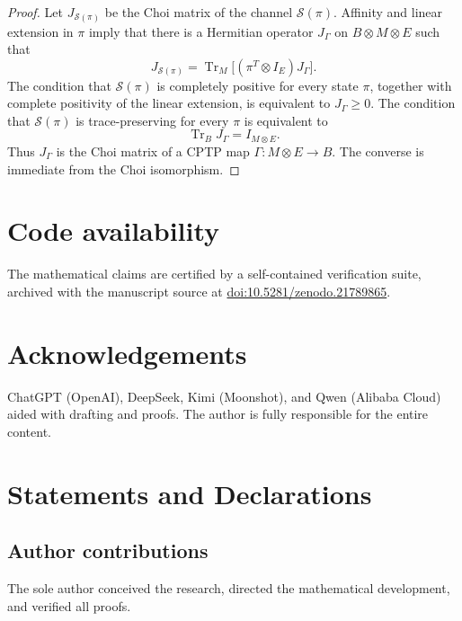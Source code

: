 \documentclass[11pt]{article}
\begin{document}
\begin{proof}
Let $J_{\mathcal S(\pi)}$ be the Choi matrix of the channel
$\mathcal S(\pi)$. Affinity and linear extension in $\pi$ imply that there
is a Hermitian operator $J_\Gamma$ on $B\otimes M\otimes E$ such that
\[
J_{\mathcal S(\pi)}
=
\operatorname{Tr}_M\bigl[(\pi^T\otimes I_E)J_\Gamma\bigr].
\]
The condition that $\mathcal S(\pi)$ is completely positive for every state
$\pi$, together with complete positivity of the linear extension, is
equivalent to $J_\Gamma\ge0$. The condition that $\mathcal S(\pi)$ is
trace-preserving for every $\pi$ is equivalent to
\[
\operatorname{Tr}_B J_\Gamma=I_{M\otimes E}.
\]
Thus $J_\Gamma$ is the Choi matrix of a CPTP map
$\Gamma:M\otimes E\to B$. The converse is immediate from the Choi
isomorphism.
\end{proof}

\section*{Code availability}
The mathematical claims are certified by a self-contained verification suite,
archived with the manuscript source at
\href{https://doi.org/10.5281/zenodo.21789865}{doi:10.5281/zenodo.21789865}.

\section*{Acknowledgements}
ChatGPT (OpenAI), DeepSeek, Kimi (Moonshot), and Qwen (Alibaba Cloud) aided with
drafting and proofs.
The author is fully responsible for the entire content.

\section*{Statements and Declarations}

\subsection*{Author contributions}
The sole author conceived the research, directed the mathematical development,
and verified all proofs.
\end{document}
